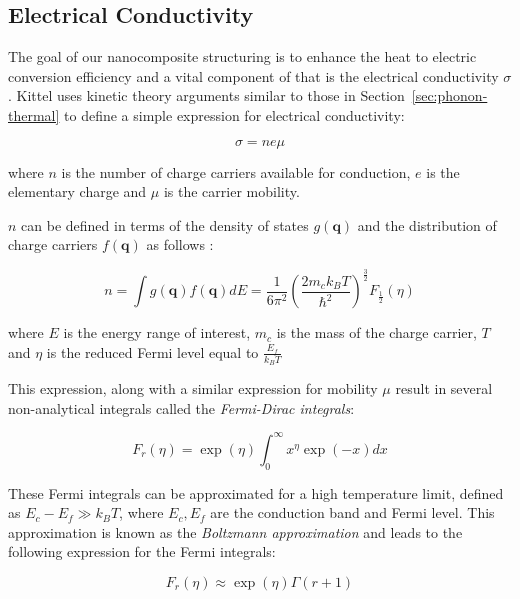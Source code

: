 \documentclass[12pt]{article}
\newcommand{\secref}[2][Section~]{#1\ref{#2}}
\renewcommand{\vec}[1]{\mathbf{#1}}
\begin{document}
\pagebreak

\subsection{Electrical Conductivity}
\label{sec:electrical-transport}
The goal of our nanocomposite structuring is to enhance the heat to electric conversion efficiency and a vital component of that is the electrical conductivity $\sigma$. Kittel \cite{kittel} uses kinetic theory arguments similar to those in \secref{sec:phonon-thermal} to define a simple expression for electrical conductivity:

\begin{equation}
\label{eq:elec-cond}
	\sigma = n e \mu
\end{equation}

where $n$ is the number of charge carriers available for conduction, $e$ is the elementary charge and $\mu$ is the carrier mobility.

$n$ can be defined in terms of the density of states $g(\vec{q})$ and the distribution of charge carriers $f(\vec{q})$ as follows \cite{kittel}:

\begin{equation}
\label{eq:carrier-number}
	n = \int g(\vec{q}) f(\vec{q}) dE = \frac{1}{6\pi^2} \left(\frac{2m_c k_B T}{\hbar^2}\right)^\frac{3}{2} F_\frac{1}{2}(\eta)
\end{equation}

where $E$ is the energy range of interest, $m_c$ is the mass of the charge carrier, $T$ and $\eta$ is the reduced Fermi level equal to $\frac{E_f}{k_B T}$

This expression, along with a similar expression for mobility $\mu$ \cite{kittel} result in several non-analytical integrals called the \emph{Fermi-Dirac integrals}:

\begin{equation}
\label{eq:fermi-integral}
	F_r(\eta) = \exp(\eta) \int_0^\infty x^\eta \exp(-x) dx
\end{equation}

These Fermi integrals can be approximated for a high temperature limit, defined as $E_c - E_f \gg k_B T$, where $E_c, E_f$ are the conduction band and Fermi level. This approximation is known as the \emph{Boltzmann approximation} \cite{kittel} and leads to the following expression for the Fermi integrals:

\begin{equation}
\label{eq:fermi-integral-approx}
	F_r(\eta) \approx \exp(\eta)\Gamma(r+1)
\end{equation}
\end{document}
